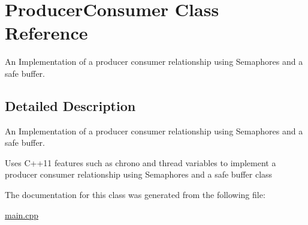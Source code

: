 \hypertarget{class_producer_consumer}{}\section{Producer\+Consumer Class Reference}
\label{class_producer_consumer}


An Implementation of a producer consumer relationship using Semaphores and a safe buffer.  




\subsection{Detailed Description}
An Implementation of a producer consumer relationship using Semaphores and a safe buffer. 

Uses C++11 features such as chrono and thread variables to implement a producer consumer relationship using Semaphores and a safe buffer class 

The documentation for this class was generated from the following file\+:\begin{DoxyCompactItemize}
\item 
\hyperlink{main_8cpp}{main.\+cpp}\end{DoxyCompactItemize}
